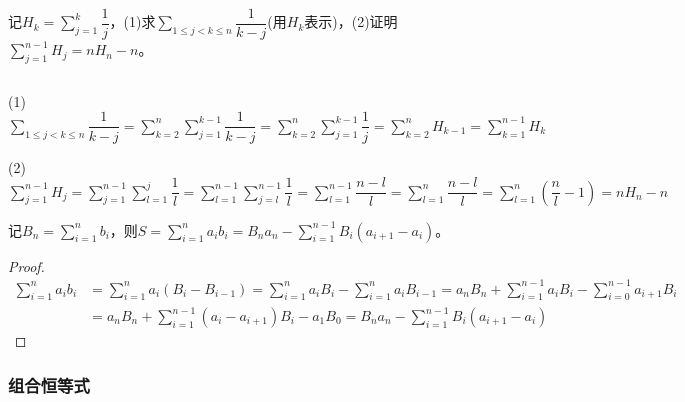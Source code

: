             \begin{example}
                记$H_{k}=\sum\limits_{j=1}^{k}\dfrac1j$，(1)求$\sum\limits_{1\leq j<k\leq n}\dfrac1{k-j}$(用$H_{k}$表示)，(2)证明$\sum\limits_{j=1}^{n-1}H_{j}=nH_n-n$。
            \end{example}

            \begin{solution}
                $ $

                (1)$\sum\limits_{1\leq j<k\leq n}\dfrac1{k-j}=\sum\limits_{k=2}^n\sum\limits_{j=1}^{k-1}\dfrac1{k-j}=\sum\limits_{k=2}^n\sum\limits_{j=1}^{k-1}\dfrac1j=\sum\limits_{k=2}^{n}H_{k-1}=\sum\limits_{k=1}^{n-1}H_{k}$

                (2)$\sum\limits_{j=1}^{n-1}H_{j}=\sum\limits_{j=1}^{n-1}\sum\limits_{l=1}^{j}\dfrac1l=\sum\limits_{l=1}^{n-1}\sum\limits_{j=l}^{n-1}\dfrac1l=\sum\limits_{l=1}^{n-1}\dfrac{n-l}l=\sum\limits_{l=1}^n\dfrac{n-l}l=\sum\limits_{l=1}^n\left(\dfrac{n}l-1\right)=nH_n-n$
            \end{solution}

            \begin{example}[(Abel)]
                记$B_n=\sum\limits_{i=1}^{n}b_i$，则$S=\sum\limits_{i=1}^{n}a_{i}b_i=B_{n}a_n-\sum\limits_{i=1}^{n-1}B_i(a_{i+1}-a_i)$。
            \end{example}

            \begin{proof}
                \begin{equation*}
                    \begin{split}
                        \sum_{i=1}^{n}a_{i}b_i&=\sum_{i=1}^{n}a_{i}(B_i-B_{i-1})=\sum_{i=1}^{n}a_{i}B_{i}-\sum_{i=1}^{n}a_{i}B_{i-1}=a_{n}B_{n}+\sum_{i=1}^{n-1}a_{i}B_{i}-\sum_{i=0}^{n-1}a_{i+1}B_i \\
                                              &=a_{n}B_{n}+\sum_{i=1}^{n-1}(a_{i}-a_{i+1})B_i-a_{1}B_{0}=B_{n}a_n-\sum_{i=1}^{n-1}B_i(a_{i+1}-a_i)
                    \end{split}
                \end{equation*}
            \end{proof}

        \subsubsection{组合恒等式}

